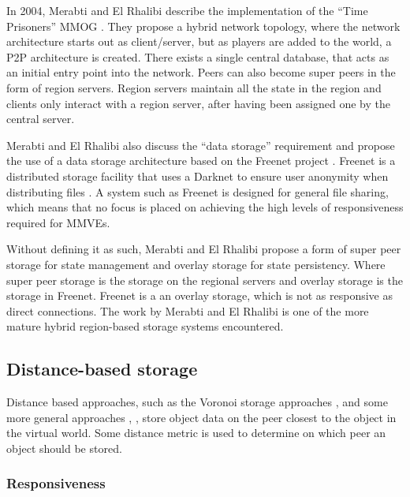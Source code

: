 In 2004, Merabti and El Rhalibi describe the implementation of the ``Time Prisoners'' MMOG \cite{using_freenet_storage}. They propose a hybrid network topology, where the network architecture starts out as client/server, but as players are added to the world, a P2P architecture is created. There exists a single central database, that acts as an initial entry point into the network. Peers can also become super peers in the form of region servers. Region servers maintain all the state in the region and clients only interact with a region server, after having been assigned one by the central server.

Merabti and El Rhalibi also discuss the ``data storage'' requirement and propose the use of a data storage architecture based on the Freenet project \cite{clarke_freenet}. Freenet is a distributed storage facility that uses a Darknet to ensure user anonymity when distributing files \cite{Darknet}. A system such as Freenet is designed for general file sharing, which means that no focus is placed on achieving the high levels of responsiveness required for MMVEs.

Without defining it as such, Merabti and El Rhalibi propose a form of super peer storage for state management and overlay storage for state persistency. Where super peer storage is the storage on the regional servers and overlay storage is the storage in Freenet. Freenet is a an overlay storage, which is not as responsive as direct connections. The work by Merabti and El Rhalibi is one of the more mature hybrid region-based storage systems encountered.

\subsection{Distance-based storage}
\label{distance_based_storage}

Distance based approaches, such as the Voronoi storage approaches \cite{Buyukkaya_voronoi_state_management}, \cite{Hu_voronoi_IM} and some more general approaches \cite{colyseus_distance_based}, \cite{solipsis}, store object data on the peer closest to the object in the virtual world. Some distance metric is used to determine on which peer an object should be stored.

\subsubsection{Responsiveness}


